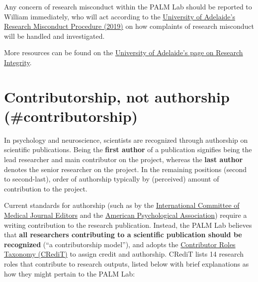 \documentclass[
]{book}
\theoremstyle{definition}
\theoremstyle{definition}
\theoremstyle{definition}
\theoremstyle{definition}
\theoremstyle{remark}
\begin{document}
Any concern of research misconduct within the PALM Lab should be reported to William immediately, who will act according to the \href{https://www.adelaide.edu.au/policies/96/?dsn=policy.document;field=data;id=7885;m=view}{University of Adelaide's Research Misconduct Procedure (2019)} on how complaints of research misconduct will be handled and investigated.

More resources can be found on the \href{https://www.adelaide.edu.au/staff/research/ethics-compliance-integrity/research-integrity}{University of Adelaide's page on Research Integrity}.

\hypertarget{contributorship-not-authorship-contributorship}{%
\section{Contributorship, not authorship (\#contributorship)}\label{contributorship-not-authorship-contributorship}}

In psychology and neuroscience, scientists are recognized through authorship on scientific publications. Being the \textbf{first author} of a publication signifies being the lead researcher and main contributor on the project, whereas the \textbf{last author} denotes the senior researcher on the project. In the remaining positions (second to second-last), order of authorship typically by (perceived) amount of contribution to the project.

Current standards for authorship (such as by the \href{https://www.icmje.org/recommendations/browse/roles-and-responsibilities/defining-the-role-of-authors-and-contributors.html}{International Committee of Medical Journal Editors} and the \href{https://www.apa.org/research/responsible/publication}{American Psychological Association}) require a writing contribution to the research publication. Instead, the PALM Lab believes that \textbf{all researchers contributing to a scientific publication should be recognized} (``a contributorship model''), and adopts the \href{https://credit.niso.org/}{Contributor Roles Taxonomy (CRediT)} to assign credit and authorship. CRediT lists 14 research roles that contribute to research outputs, listed below with brief explanations as how they might pertain to the PALM Lab:
\end{document}
